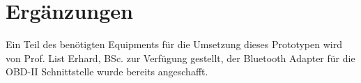 \chapter{Ergänzungen}
Ein Teil des benötigten Equipments für die Umsetzung dieses Prototypen  wird von Prof. List Erhard, BSc. zur Verfügung gestellt, der Bluetooth Adapter für die OBD-II Schnittstelle wurde bereits angeschafft.